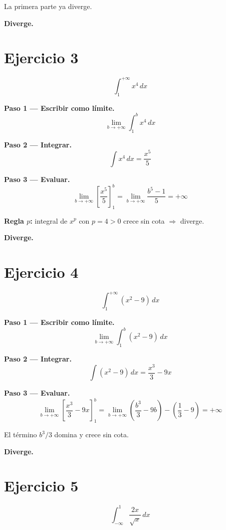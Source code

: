 \documentclass[12pt,a4paper]{article}
\newcommand{\diverge}{%
  \textcolor{divcolor}{\textbf{Diverge.}}%
}
\begin{document}
La primera parte ya diverge.

\medskip\diverge

\bigskip
\section*{Ejercicio 3}
\[
  \int_{1}^{+\infty} x^4\,dx
\]

\textbf{Paso 1 — Escribir como límite.}
\[
  \lim_{b\to+\infty} \int_{1}^{b} x^4\,dx
\]

\textbf{Paso 2 — Integrar.}
\[
  \int x^4\,dx = \frac{x^5}{5}
\]

\textbf{Paso 3 — Evaluar.}
\[
  \lim_{b\to+\infty} \left[\frac{x^5}{5}\right]_{1}^{b}
  = \lim_{b\to+\infty}\frac{b^5 - 1}{5} = +\infty
\]

\textbf{Regla $p$:} integral de $x^p$ con $p=4>0$ crece sin cota $\Rightarrow$ diverge.

\medskip\diverge

\bigskip
\section*{Ejercicio 4}
\[
  \int_{1}^{+\infty} (x^2 - 9)\,dx
\]

\textbf{Paso 1 — Escribir como límite.}
\[
  \lim_{b\to+\infty} \int_{1}^{b} (x^2 - 9)\,dx
\]

\textbf{Paso 2 — Integrar.}
\[
  \int (x^2-9)\,dx = \frac{x^3}{3} - 9x
\]

\textbf{Paso 3 — Evaluar.}
\[
  \lim_{b\to+\infty}\left[\frac{x^3}{3}-9x\right]_{1}^{b}
  = \lim_{b\to+\infty}\left(\frac{b^3}{3}-9b\right) - \left(\frac{1}{3}-9\right)
  = +\infty
\]

El término $b^3/3$ domina y crece sin cota.

\medskip\diverge

\bigskip
\section*{Ejercicio 5}
\[
  \int_{-\infty}^{1} \frac{2x}{\sqrt{x}}\,dx
\]
\end{document}
